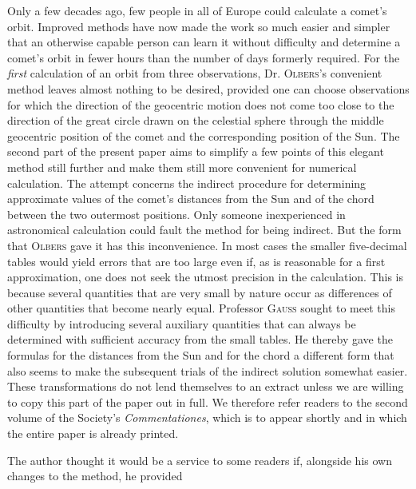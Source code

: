 %
Only a few decades ago, few people in all of Europe could calculate a comet’s orbit. Improved methods have now made the work so much easier and simpler that an otherwise capable person can learn it without difficulty and determine a comet’s orbit in fewer hours than the number of days formerly required. For the \textit{first} calculation of an orbit from three observations, Dr. \textsc{Olbers}’s convenient method leaves almost nothing to be desired, provided one can choose observations for which the direction of the geocentric motion does not come too close to the direction of the great circle drawn on the celestial sphere through the middle geocentric position of the comet and the corresponding position of the Sun. The second part of the present paper aims to simplify a few points of this elegant method still further and make them still more convenient for numerical calculation. The attempt concerns the indirect procedure for determining approximate values of the comet’s distances from the Sun and of the chord between the two outermost positions. Only someone inexperienced in astronomical calculation could fault the method for being indirect. But the form that \textsc{Olbers} gave it has this inconvenience. In most cases the smaller five-decimal tables would yield errors that are too large even if, as is reasonable for a first approximation, one does not seek the utmost precision in the calculation. This is because several quantities that are very small by nature occur as differences of other quantities that become nearly equal. Professor \textsc{Gauss} sought to meet this difficulty by introducing several auxiliary quantities that can always be determined with sufficient accuracy from the small tables. He thereby gave the formulas for the distances from the Sun and for the chord a different form that also seems to make the subsequent trials of the indirect solution somewhat easier. These transformations do not lend themselves to an extract unless we are willing to copy this part of the paper out in full. We therefore refer readers to the second volume of the Society’s \textit{Commentationes}, which is to appear shortly and in which the entire paper is already printed.

The author thought it would be a service to some readers if, alongside his own changes to the method, he provided
